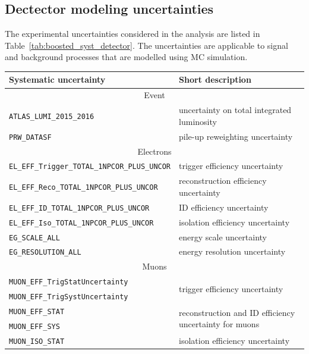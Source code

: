  
  

\subsection{Dectector modeling uncertainties}
\label{sec:boosted_syst_detector}
 
The experimental uncertainties considered in the analysis are listed in Table~\ref{tab:boosted_syst_detector}.
The uncertainties are applicable to signal and background processes that are modelled using MC simulation.
 
\begin{table}
\resizebox{\textwidth}{!}
{
\begin{tabular}{l|l}
 
\hline
Systematic uncertainty & Short description \\
\hline
\multicolumn{2}{c}{Event} \\
\hline
\texttt{ATLAS\_LUMI\_2015\_2016} & uncertainty on total integrated luminosity \\
\hline
\texttt{PRW\_DATASF} & pile-up reweighting uncertainty \\
\hline
\multicolumn{2}{c}{Electrons} \\
\hline
\texttt{EL\_EFF\_Trigger\_TOTAL\_1NPCOR\_PLUS\_UNCOR} &  trigger efficiency uncertainty \\
\texttt{EL\_EFF\_Reco\_TOTAL\_1NPCOR\_PLUS\_UNCOR}         &  reconstruction efficiency uncertainty \\
\texttt{EL\_EFF\_ID\_TOTAL\_1NPCOR\_PLUS\_UNCOR}         &  ID efficiency uncertainty \\
\texttt{EL\_EFF\_Iso\_TOTAL\_1NPCOR\_PLUS\_UNCOR}          &  isolation efficiency uncertainty \\
\texttt{EG\_SCALE\_ALL} &        energy scale uncertainty          \\        
\texttt{EG\_RESOLUTION\_ALL} &    energy resolution uncertainty    \\  
\hline
\multicolumn{2}{c}{Muons} \\
\hline
\texttt{MUON\_EFF\_TrigStatUncertainty} &  \multirow{2}{*}{trigger efficiency uncertainty} \\  
\texttt{MUON\_EFF\_TrigSystUncertainty} &  \\
\texttt{MUON\_EFF\_STAT} &  \multirow{2}{*}{reconstruction and ID efficiency uncertainty for muons}\\  
\texttt{MUON\_EFF\_SYS} &  \\
\texttt{MUON\_ISO\_STAT} &  \multirow{2}{*}{isolation efficiency uncertainty}\\  

\end{tabular}}
\end{table}
